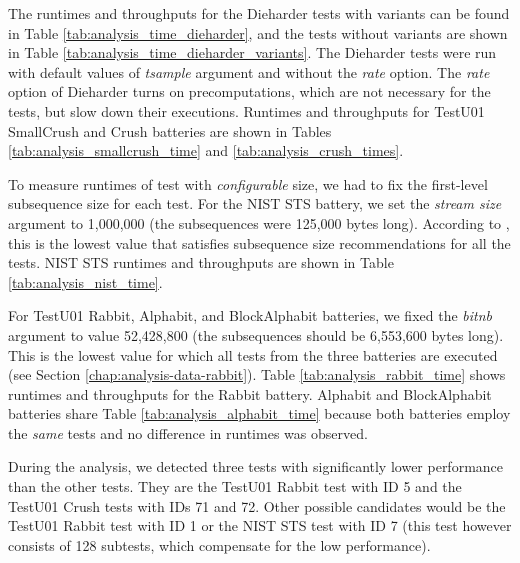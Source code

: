 \documentclass[
  digital,     %
  oneside,     %
  nosansbold,  %
  nocolorbold, %
  nolof,         %
  nolot,         %
]{fithesis4}
\begin{document}
The runtimes and throughputs for the Dieharder tests with variants can be found in Table \ref{tab:analysis_time_dieharder}, and the tests without variants are shown in Table \ref{tab:analysis_time_dieharder_variants}. The Dieharder tests were run with default values of \emph{tsample} argument and without the \emph{rate} option. The \emph{rate} option of Dieharder turns on precomputations, which are not necessary for the tests, but slow down their executions. Runtimes and throughputs for TestU01 SmallCrush and Crush batteries are shown in Tables \ref{tab:analysis_smallcrush_time} and \ref{tab:analysis_crush_times}.

To measure runtimes of test with \emph{configurable} size, we had to fix the first-level subsequence size for each test. For the NIST STS battery, we set the \emph{stream size} argument to 1,000,000 (the subsequences were 125,000  bytes long). According to \cite{nist_special}, this is the lowest value that satisfies subsequence size recommendations for all the tests. NIST STS runtimes and throughputs are shown in Table \ref{tab:analysis_nist_time}.

For TestU01 Rabbit, Alphabit, and BlockAlphabit batteries, we fixed the \emph{bit\textunderscore nb} argument to value 52,428,800 (the subsequences should be 6,553,600 bytes long). This is the lowest value for which all tests from the three batteries are executed (see Section \ref{chap:analysis-data-rabbit}). Table \ref{tab:analysis_rabbit_time} shows runtimes and throughputs for the Rabbit battery. Alphabit and BlockAlphabit batteries share Table \ref{tab:analysis_alphabit_time} because both batteries employ the \emph{same} tests and no difference in runtimes was observed.

During the analysis, we detected three tests with significantly lower performance than the other tests. They are the TestU01 Rabbit test with ID 5 and the TestU01 Crush tests with IDs 71 and 72. Other possible candidates would be the TestU01 Rabbit test with ID 1 or the NIST STS test with ID 7 (this test however consists of 128 subtests, which compensate for the low performance).
\end{document}
